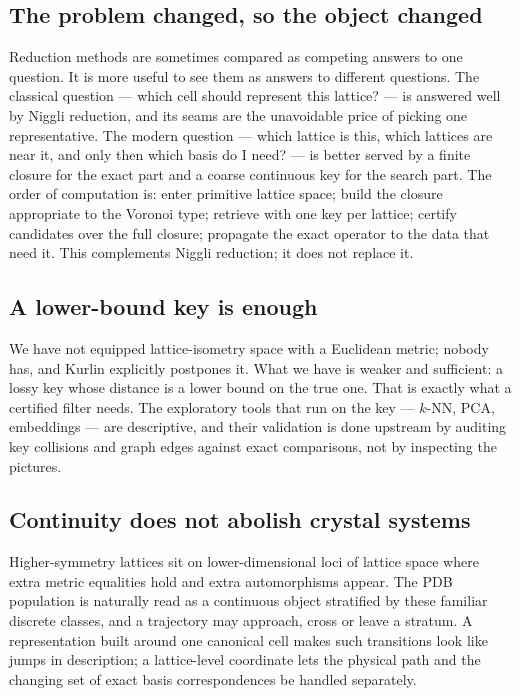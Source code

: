 \documentclass[11pt]{article}
\begin{document}
\subsection{The problem changed, so the object changed}

Reduction methods are sometimes compared as competing answers to one question. It is more useful to see them as answers to different questions. The classical question --- which cell should represent this lattice? --- is answered well by Niggli reduction, and its seams are the unavoidable price of picking one representative. The modern question --- which lattice is this, which lattices are near it, and only then which basis do I need? --- is better served by a finite closure for the exact part and a coarse continuous key for the search part. The order of computation is: enter primitive lattice space; build the closure appropriate to the Voronoi type; retrieve with one key per lattice; certify candidates over the full closure; propagate the exact operator to the data that need it. This complements Niggli reduction; it does not replace it.

\subsection{A lower-bound key is enough}

We have not equipped lattice-isometry space with a Euclidean metric; nobody has, and Kurlin explicitly postpones it. What we have is weaker and sufficient: a lossy key whose distance is a lower bound on the true one. That is exactly what a certified filter needs. The exploratory tools that run on the key --- $k$-NN, PCA, embeddings --- are descriptive, and their validation is done upstream by auditing key collisions and graph edges against exact comparisons, not by inspecting the pictures.

\subsection{Continuity does not abolish crystal systems}

Higher-symmetry lattices sit on lower-dimensional loci of lattice space where extra metric equalities hold and extra automorphisms appear. The PDB population is naturally read as a continuous object stratified by these familiar discrete classes, and a trajectory may approach, cross or leave a stratum. A representation built around one canonical cell makes such transitions look like jumps in description; a lattice-level coordinate lets the physical path and the changing set of exact basis correspondences be handled separately.
\end{document}
